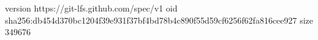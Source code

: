 version https://git-lfs.github.com/spec/v1
oid sha256:db454d370bc1204f39e931f37bf4bd78b4c890f55d59cf6256f62fa816cee927
size 349676
